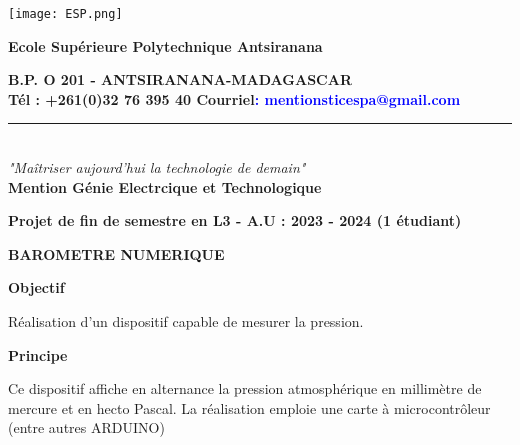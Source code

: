 







\begin{center}
	\begin{minipage}{2.5cm}
	\begin{center}
	\hspace{-3cm}
		\texttt{[image: ESP.png]}	
	\end{center}
\end{minipage}\hfill
\begin{minipage}{13cm}
	\begin{center}
    \textbf{Ecole Supérieure Polytechnique Antsiranana}
    \center
    
    \textbf{B.P. O 201 - ANTSIRANANA-MADAGASCAR}\\[2mm]
    \hspace{-1cm}
    \textbf{Tél : +261(0)32 76 395 40 Courriel\textcolor{blue}{: mentionsticespa@gmail.com}}
 	\noindent\rule{\linewidth}{0.5pt}
     
	\end{center}
\end{minipage}\hfill \\[5mm]


\center
\textit{"Maîtriser aujourd'hui la technologie de demain"}\\ [0.5cm]
\center
\textbf{Mention Génie Electrcique et Technologique}\\[5mm]
\center


\center
\textbf{Projet de fin de semestre en L3 - A.U : 2023 - 2024 (1 étudiant)}\\[0.8cm]
\center 

\center
\textbf{BAROMETRE NUMERIQUE}\\[5mm]
\center

\hspace{-15cm}
\textbf{Objectif} \\[1mm]
\begin{flushleft}
Réalisation d’un dispositif capable de mesurer la pression. \\ [3mm]
\end{flushleft}

\hspace{-15cm}
\textbf{Principe} \\[5mm]
\begin{flushleft}
Ce dispositif affiche en alternance la pression atmosphérique en
millimètre de mercure et en hecto Pascal.
La réalisation emploie une carte à microcontrôleur (entre autres ARDUINO) \\ [3mm]
\end{flushleft}


\end{center}
